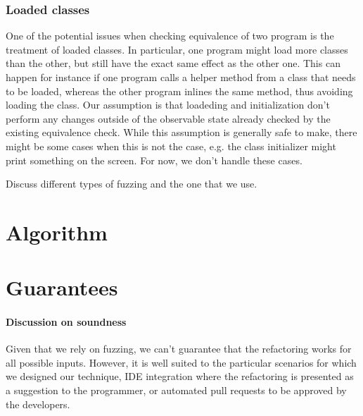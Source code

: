 \documentclass[runningheads,a4paper]{llncs}
\begin{document}







\subsubsection{Loaded classes}

One of the potential issues when checking equivalence of two program
is the treatment of loaded classes. In particular, one program might
load more classes than the other, but still have the exact same effect
as the other one. This can happen for instance if one program calls a
helper method from a class that needs to be loaded, whereas the other
program inlines the same method, thus avoiding loading the class.  Our
assumption is that loadeding and initialization don't perform any
changes outside of the observable state already checked by the
existing equivalence check.  While this assumption is generally safe
to make, there might be some cases when this is not the case, e.g. the
class initializer might print something on the screen. For now, we
don't handle these cases.





Discuss different types of fuzzing and the one that we use.

\section{Algorithm}


\section{Guarantees}

\paragraph{Discussion on soundness} Given that we rely on fuzzing, we can't guarantee that the
refactoring works for all possible inputs. However, it is well suited
to the particular scenarios for which we designed our technique,
IDE integration where the refactoring is presented as a suggestion to the programmer,
or automated pull requests to be approved by the developers.
\end{document}
